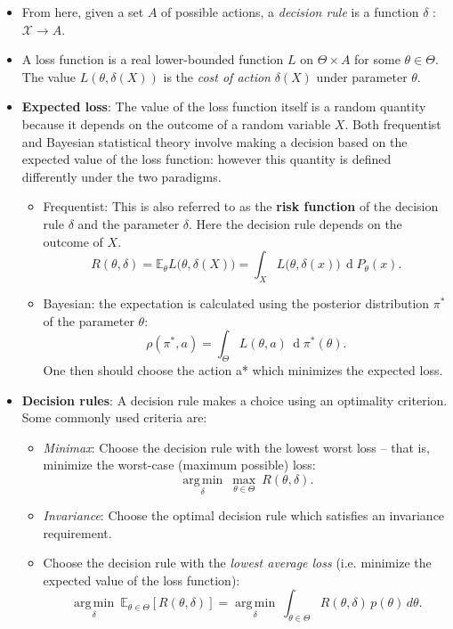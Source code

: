 \documentclass{article}
\begin{document}
\begin{itemize}
\begin{itemize}
\item From here, given a set $A$ of possible actions, a {\em decision rule} is a function $\delta$ : $\scriptstyle\mathcal{X}\rightarrow A$.


\item A loss function is a real lower-bounded function $L$ on $\Theta\times A$ for some $\theta\in\Theta$. The value $L(\theta, \delta(X))$ is the {\em cost of action} $\delta(X)$ under parameter $\theta$.

\item {\bf Expected loss}: The value of the loss function itself is a random quantity because it depends on the outcome of a random variable $X$. Both frequentist and Bayesian statistical theory involve making a decision based on the expected value of the loss function: however this quantity is defined differently under the two paradigms.

\begin{itemize}
\item Frequentist: This is also referred to as the {\bf risk function} of the decision rule $\delta$ and the parameter $\delta$. Here the decision rule depends on the outcome of $X$.
\[R(\theta, \delta) = \mathbb{E}_\theta L\big( \theta, \delta(X) \big) = \int_X L\big( \theta, \delta(x) \big) \, \operatorname{d} P_\theta (x) .\]

\item Bayesian: the expectation is calculated using the posterior distribution $\pi^*$ of the parameter $\theta$:\[\rho(\pi^*,a) = \int_\Theta L(\theta, a) \, \operatorname{d} \pi^* (\theta).\]
One then should choose the action a* which minimizes the expected loss.
\end{itemize}


\item {\bf Decision rules}: A decision rule makes a choice using an optimality criterion. Some commonly used criteria are:
\begin{itemize}
\item {\em Minimax}: Choose the decision rule with the lowest worst loss -- that is, minimize the worst-case (maximum possible) loss:
\[ \underset{\delta} {\operatorname{arg\,min}} \ \max_{\theta \in \Theta} \ R(\theta,\delta).\] 
\item {\em Invariance}: Choose the optimal decision rule which satisfies an invariance requirement.
\item Choose the decision rule with the {\em lowest average loss} (i.e. minimize the expected value of the loss function):
\[ \underset{\delta} {\operatorname{arg\,min}} \ \mathbb{E}_{\theta \in \Theta} [R(\theta,\delta)] = \underset{\delta} {\operatorname{arg\,min}} \ \int_{\theta \in \Theta} R(\theta,\delta) \, p(\theta) \,d\theta. \]
\end{itemize}


\end{itemize}
\end{itemize}
\end{document}
